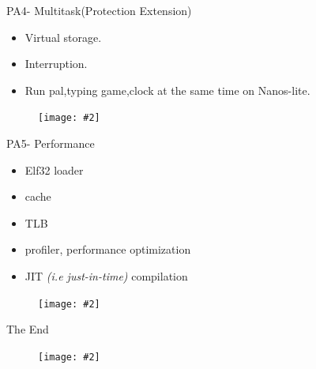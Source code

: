 \documentclass{beamer}
\newcommand{\fignocaption}[2]{
	\begin{figure}[htp]
		\centering
		\texttt{[image: \#2]}
	\end{figure}
}
\begin{document}
\begin{frame}{PA4- Multitask(Protection Extension)}
	\begin{itemize}
	\item Virtual storage.
	\item Interruption.
	\item Run pal,typing game,clock at the same time on Nanos-lite.
\end{itemize}
\fignocaption{scale=0.4}{am.png}	
\end{frame}

\begin{frame}{PA5- Performance}
	\begin{itemize}
		\item Elf32 loader
		\item cache
		\item TLB
		\item profiler, performance optimization
		\item JIT \textit{(i.e just-in-time)} compilation
	\end{itemize}
\end{frame}

\begin{frame}
	\fignocaption{scale=0.4}{estimatedTime.png}
\end{frame}

\begin{frame}{The End}
	\fignocaption{scale=0.8}{studentFeedback.png}
\end{frame}
\end{document}
